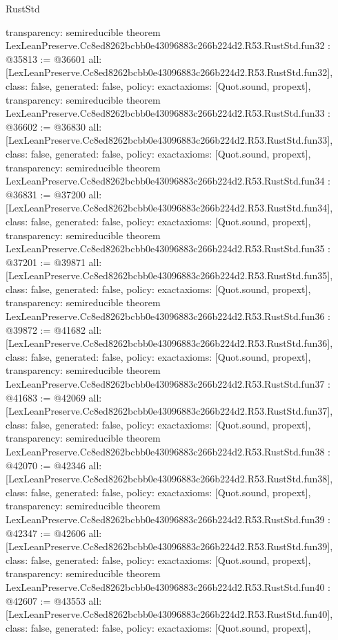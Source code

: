 \begin{lexlean}{RustStd}
\begin{coremodule}
{  transparency: semireducible
}
theorem LexLeanPreserve.Cc8ed8262bcbb0e43096883c266b224d2.R53.RustStd.fun32 : @35813 := @36601 {
  all: [LexLeanPreserve.Cc8ed8262bcbb0e43096883c266b224d2.R53.RustStd.fun32],
  class: false,
  generated: false,
  policy: exact{axioms: [Quot.sound, propext]},
  transparency: semireducible
}
theorem LexLeanPreserve.Cc8ed8262bcbb0e43096883c266b224d2.R53.RustStd.fun33 : @36602 := @36830 {
  all: [LexLeanPreserve.Cc8ed8262bcbb0e43096883c266b224d2.R53.RustStd.fun33],
  class: false,
  generated: false,
  policy: exact{axioms: [Quot.sound, propext]},
  transparency: semireducible
}
theorem LexLeanPreserve.Cc8ed8262bcbb0e43096883c266b224d2.R53.RustStd.fun34 : @36831 := @37200 {
  all: [LexLeanPreserve.Cc8ed8262bcbb0e43096883c266b224d2.R53.RustStd.fun34],
  class: false,
  generated: false,
  policy: exact{axioms: [Quot.sound, propext]},
  transparency: semireducible
}
theorem LexLeanPreserve.Cc8ed8262bcbb0e43096883c266b224d2.R53.RustStd.fun35 : @37201 := @39871 {
  all: [LexLeanPreserve.Cc8ed8262bcbb0e43096883c266b224d2.R53.RustStd.fun35],
  class: false,
  generated: false,
  policy: exact{axioms: [Quot.sound, propext]},
  transparency: semireducible
}
theorem LexLeanPreserve.Cc8ed8262bcbb0e43096883c266b224d2.R53.RustStd.fun36 : @39872 := @41682 {
  all: [LexLeanPreserve.Cc8ed8262bcbb0e43096883c266b224d2.R53.RustStd.fun36],
  class: false,
  generated: false,
  policy: exact{axioms: [Quot.sound, propext]},
  transparency: semireducible
}
theorem LexLeanPreserve.Cc8ed8262bcbb0e43096883c266b224d2.R53.RustStd.fun37 : @41683 := @42069 {
  all: [LexLeanPreserve.Cc8ed8262bcbb0e43096883c266b224d2.R53.RustStd.fun37],
  class: false,
  generated: false,
  policy: exact{axioms: [Quot.sound, propext]},
  transparency: semireducible
}
theorem LexLeanPreserve.Cc8ed8262bcbb0e43096883c266b224d2.R53.RustStd.fun38 : @42070 := @42346 {
  all: [LexLeanPreserve.Cc8ed8262bcbb0e43096883c266b224d2.R53.RustStd.fun38],
  class: false,
  generated: false,
  policy: exact{axioms: [Quot.sound, propext]},
  transparency: semireducible
}
theorem LexLeanPreserve.Cc8ed8262bcbb0e43096883c266b224d2.R53.RustStd.fun39 : @42347 := @42606 {
  all: [LexLeanPreserve.Cc8ed8262bcbb0e43096883c266b224d2.R53.RustStd.fun39],
  class: false,
  generated: false,
  policy: exact{axioms: [Quot.sound, propext]},
  transparency: semireducible
}
theorem LexLeanPreserve.Cc8ed8262bcbb0e43096883c266b224d2.R53.RustStd.fun40 : @42607 := @43553 {
  all: [LexLeanPreserve.Cc8ed8262bcbb0e43096883c266b224d2.R53.RustStd.fun40],
  class: false,
  generated: false,
  policy: exact{axioms: [Quot.sound, propext]},
}
\end{coremodule}
\end{lexlean}

